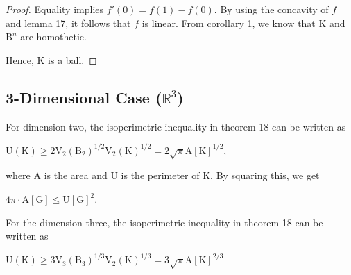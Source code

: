 \documentclass[a4paper]{book}
\numberwithin{theorem}{section}%
\begin{document}
\begin{proof}
    Equality implies $f'(0)=f(1)-f(0)$. By using the concavity of $f$ and lemma 17, it follows that $f$ is linear. From corollary 1, we know that $\mathrm{K}$ and $\mathrm{B}^{n}$ are homothetic.

    Hence, $\mathrm{K}$ is a ball.
\end{proof}

\subsection{3-Dimensional Case ($\mathbb{R}^{3}$)}
For dimension two, the isoperimetric inequality in theorem 18 can be written as
\begin{center}
$\displaystyle \mathrm{U}(\mathrm{K})\geq 2\mathrm{V}_{2}(\mathrm{B}_{2})^{1/2}\mathrm{V}_{2}(\mathrm{K})^{1/2}=2\sqrt{\pi}\mathrm{A}[\mathrm{K}]^{1/2}$,
\end{center}
where $\mathrm{A}$ is the area and $\mathrm{U}$ is the perimeter of $\mathrm{K}$. By squaring this, we get
\begin{center}
$4\pi\cdot\mathrm{A}[\mathrm{G}]\leq\mathrm{U}[\mathrm{G}]^{2}$.
\end{center}

For the dimension three, the isoperimetric inequality in theorem 18 can be written as
\begin{center}
$\displaystyle \mathrm{U}(\mathrm{K})\geq 3\mathrm{V}_{3}(\mathrm{B}_{3})^{1/3}\mathrm{V}_{2}(\mathrm{K})^{1/3}=3\sqrt{\pi}\mathrm{A}[\mathrm{K}]^{2/3}$
\end{center}


\end{document}
